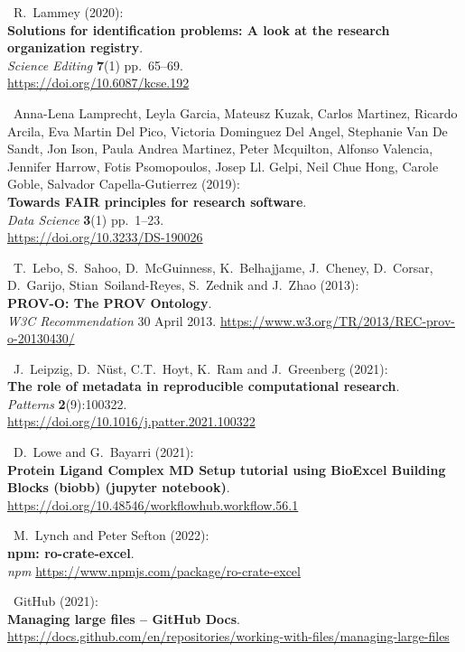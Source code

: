 \begin{thebibliography}{9}
~R.~Lammey (2020):\\
\textbf{Solutions for identification problems: A look at the research
organization registry}.\\
\emph{Science Editing} \textbf{7}(1) pp.~65--69.\\
\url{https://doi.org/10.6087/kcse.192}

~Anna-Lena Lamprecht, Leyla Garcia, Mateusz Kuzak, Carlos
Martinez, Ricardo Arcila, Eva Martin Del Pico, Victoria Dominguez Del
Angel, Stephanie Van De Sandt, Jon Ison, Paula Andrea Martinez, Peter
Mcquilton, Alfonso Valencia, Jennifer Harrow, Fotis Psomopoulos, Josep
Ll. Gelpi, Neil Chue Hong, Carole Goble, Salvador Capella-Gutierrez
(2019):\\
\textbf{Towards FAIR principles for research software}.\\
\emph{Data Science} \textbf{3}(1) pp.~1--23.\\
\url{https://doi.org/10.3233/DS-190026}

~T.~Lebo, S.~Sahoo, D.~McGuinness, K.~Belhajjame, J.~Cheney,
D.~Corsar, D.~Garijo, Stian~Soiland-Reyes, S.~Zednik and J.~Zhao
(2013):\\
\textbf{PROV-O: The PROV Ontology}.\\
\emph{W3C Recommendation} 30 April 2013.
\url{https://www.w3.org/TR/2013/REC-prov-o-20130430/}

~J.~Leipzig, D.~Nüst, C.T.~Hoyt, K.~Ram and J.~Greenberg
(2021):\\
\textbf{The role of metadata in reproducible computational research}.\\
\emph{Patterns} \textbf{2}(9):100322.\\
\url{https://doi.org/10.1016/j.patter.2021.100322}

~D.~Lowe and G.~Bayarri (2021):\\
\textbf{Protein Ligand Complex MD Setup tutorial using BioExcel Building
Blocks (biobb) (jupyter notebook)}.\\
\url{https://doi.org/10.48546/workflowhub.workflow.56.1}

~M.~Lynch and Peter Sefton (2022):\\
\textbf{npm: ro-crate-excel}.\\
\emph{npm} \url{https://www.npmjs.com/package/ro-crate-excel}

~GitHub (2021):\\
\textbf{Managing large files -- GitHub Docs}.\\
\url{https://docs.github.com/en/repositories/working-with-files/managing-large-files}


\end{thebibliography}
